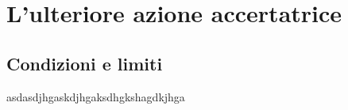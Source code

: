 \chapter{L'ulteriore azione accertatrice}
\section{Condizioni e limiti}
asdasdjhgaskdjhgaksdhgkshagdkjhga
